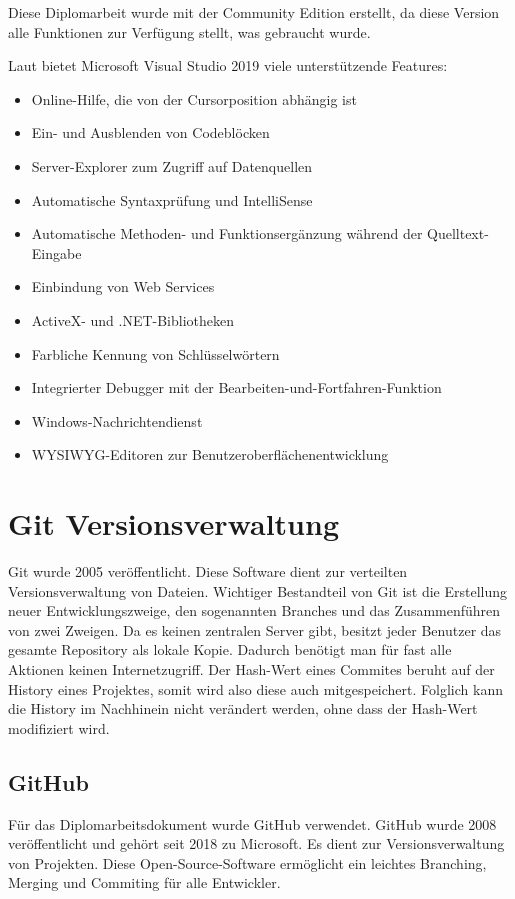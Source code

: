 Diese Diplomarbeit wurde mit der Community Edition erstellt, da diese Version alle Funktionen zur Verfügung stellt, was gebraucht wurde. \autocite{wikiVisualStudio}

Laut \autocite{wikiVisualStudio} bietet Microsoft Visual Studio 2019 viele unterstützende Features:

\begin{itemize}
	\item Online-Hilfe, die von der Cursorposition abhängig ist
	\item Ein- und Ausblenden von Codeblöcken
	\item Server-Explorer zum Zugriff auf Datenquellen
	\item Automatische Syntaxprüfung und IntelliSense
	\item Automatische Methoden- und Funktionsergänzung während der Quelltext-Eingabe
	\item Einbindung von Web Services
	\item ActiveX- und .NET-Bibliotheken
	\item Farbliche Kennung von Schlüsselwörtern
	\item Integrierter Debugger mit der Bearbeiten-und-Fortfahren-Funktion
	\item Windows-Nachrichtendienst
	\item WYSIWYG-Editoren zur Benutzeroberflächenentwicklung
\end{itemize}
\section{Git Versionsverwaltung}
Git wurde 2005 veröffentlicht. Diese Software dient zur verteilten Versionsverwaltung von Dateien. Wichtiger Bestandteil von Git ist die Erstellung neuer Entwicklungszweige, den sogenannten Branches und das Zusammenführen von zwei Zweigen. Da es keinen zentralen Server gibt, besitzt jeder Benutzer das gesamte Repository als lokale Kopie. Dadurch benötigt man für fast alle Aktionen keinen Internetzugriff. Der Hash-Wert eines Commites beruht auf der History eines Projektes, somit wird also diese auch mitgespeichert. Folglich kann die History im Nachhinein nicht verändert werden, ohne dass der Hash-Wert modifiziert wird. \autocite{wikiGit}

\subsection{GitHub}
Für das Diplomarbeitsdokument wurde GitHub verwendet. GitHub wurde 2008 veröffentlicht und gehört seit 2018 zu Microsoft. Es dient zur Versionsverwaltung von Projekten. Diese Open-Source-Software ermöglicht ein leichtes Branching, Merging und Commiting für alle Entwickler. \autocite{wikiGitHub}

